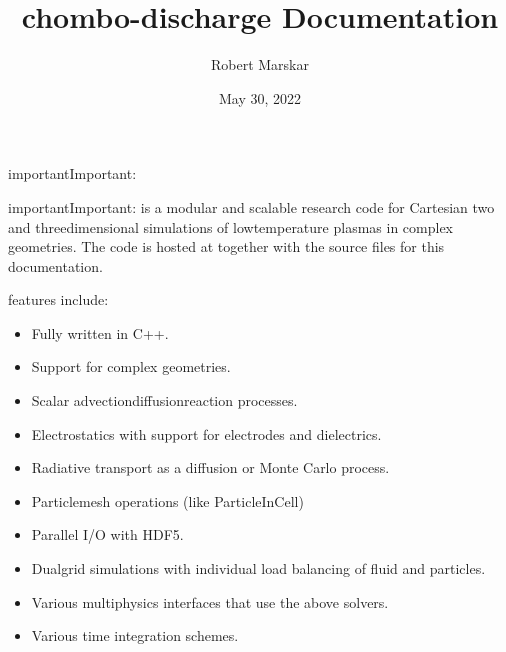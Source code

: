 \documentclass[letterpaper,10pt,english]{sphinxmanual}
\title{chombo-discharge Documentation}
\date{May 30, 2022}
\author{Robert Marskar}
\begin{document}
\pagestyle{empty}
\sphinxmaketitle
\pagestyle{plain}
\sphinxtableofcontents
\pagestyle{normal}
\label{\detokenize{index::doc}}
\begin{sphinxadmonition}{important}{Important:}
\end{sphinxadmonition}



\begin{sphinxadmonition}{important}{Important:}
 is a modular and scalable research code for Cartesian two\sphinxhyphen{} and three\sphinxhyphen{}dimensional simulations of low\sphinxhyphen{}temperature plasmas in complex geometries.
The code is hosted at  together with the source files for this documentation.
\end{sphinxadmonition}

 features include:
\begin{itemize}
\item {} 
Fully written in C++.

\item {} 
Support for complex geometries.

\item {} 
Scalar advection\sphinxhyphen{}diffusion\sphinxhyphen{}reaction processes.

\item {} 
Electrostatics with support for electrodes and dielectrics.

\item {} 
Radiative transport as a diffusion or Monte Carlo process.

\item {} 
Particle\sphinxhyphen{}mesh operations (like Particle\sphinxhyphen{}In\sphinxhyphen{}Cell)

\item {} 
Parallel I/O with HDF5.

\item {} 
Dual\sphinxhyphen{}grid simulations with individual load balancing of fluid and particles.

\item {} 
Various multi\sphinxhyphen{}physics interfaces that use the above solvers.

\item {} 
Various time integration schemes.

\end{itemize}
\end{document}
